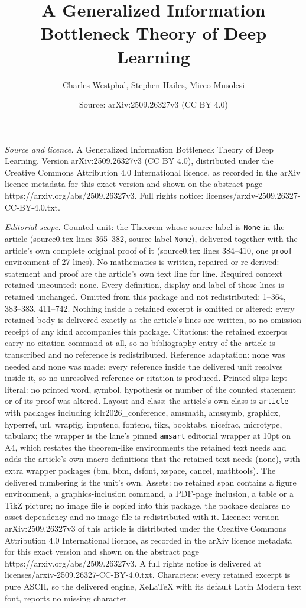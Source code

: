 \documentclass[10pt,a4paper]{amsart}
\title[A Generalized Information Bottleneck Theory of Deep Learning]{A Generalized Information Bottleneck Theory of Deep Learning}
\author{Charles Westphal, Stephen Hailes, Mirco Musolesi}
\date{Source: arXiv:2509.26327v3 (CC BY 4.0)}
\begin{document}
\maketitle

\noindent\emph{Source and licence.} A Generalized Information Bottleneck Theory of Deep Learning. Version arXiv:2509.26327v3 (CC BY 4.0), distributed under the Creative Commons Attribution 4.0 International licence, as recorded in the arXiv licence metadata for this exact version and shown on the abstract page https://arxiv.org/abs/2509.26327v3. Full rights notice: licenses/arxiv-2509.26327-CC-BY-4.0.txt.\par\smallskip

\noindent\textit{Editorial scope.} Counted unit: the Theorem whose source label is \texttt{None} in the article (source0.tex lines 365--382, source label \texttt{None}), delivered together with the article's own complete original proof of it (source0.tex lines 384--410, one \texttt{proof} environment of 27 lines). No mathematics is written, repaired or re-derived: statement and proof are the article's own text line for line. Required context retained uncounted: none. Every definition, display and label of those lines is retained unchanged. Omitted from this package and not redistributed: 1--364, 383--383, 411--742. Nothing inside a retained excerpt is omitted or altered: every retained body is delivered exactly as the article's lines are written, so no omission receipt of any kind accompanies this package. Citations: the retained excerpts carry no citation command at all, so no bibliography entry of the article is transcribed and no reference is redistributed. Reference adaptation: none was needed and none was made; every reference inside the delivered unit resolves inside it, so no unresolved reference or citation is produced. Printed slips kept literal: no printed word, symbol, hypothesis or number of the counted statement or of its proof was altered. Layout and class: the article's own class is \texttt{article} with packages including iclr2026\_conference, amsmath, amssymb, graphicx, hyperref, url, wrapfig, inputenc, fontenc, tikz, booktabs, nicefrac, microtype, tabularx; the wrapper is the lane's pinned \texttt{amsart} editorial wrapper at 10pt on A4, which restates the theorem-like environments the retained text needs and adds the article's own macro definitions that the retained text needs (none), with extra wrapper packages (bm, bbm, dsfont, xspace, cancel, mathtools). The delivered numbering is the unit's own. Assets: no retained span contains a figure environment, a graphics-inclusion command, a PDF-page inclusion, a table or a TikZ picture; no image file is copied into this package, the package declares no asset dependency and no image file is redistributed with it. Licence: version arXiv:2509.26327v3 of this article is distributed under the Creative Commons Attribution 4.0 International licence, as recorded in the arXiv licence metadata for this exact version and shown on the abstract page https://arxiv.org/abs/2509.26327v3. A full rights notice is delivered at licenses/arxiv-2509.26327-CC-BY-4.0.txt. Characters: every retained excerpt is pure ASCII, so the delivered engine, XeLaTeX with its default Latin Modern text font, reports no missing character.
\end{document}
